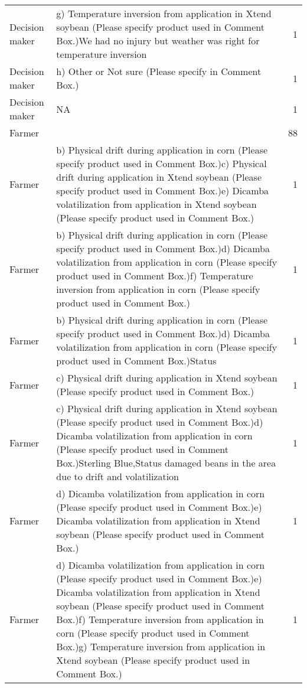 \documentclass[]{article}
\begin{document}
\begin{table}[H]
\begin{tabular}{llr}
Decision maker & g) Temperature inversion from application in Xtend soybean (Please specify product used in Comment Box.)We had no injury but weather was right for temperature inversion & 1\\
Decision maker & h) Other or Not sure (Please specify in Comment Box.) & 1\\
Decision maker & NA & 1\\
Farmer &  & 88\\
\addlinespace
Farmer & b) Physical drift during application in corn (Please specify product used in Comment Box.)c) Physical drift during application in Xtend soybean (Please specify product used in Comment Box.)e) Dicamba volatilization from application in Xtend soybean (Please specify product used in Comment Box.) & 1\\
Farmer & b) Physical drift during application in corn (Please specify product used in Comment Box.)d) Dicamba volatilization from application in corn (Please specify product used in Comment Box.)f) Temperature inversion from application in corn (Please specify product used in Comment Box.) & 1\\
Farmer & b) Physical drift during application in corn (Please specify product used in Comment Box.)d) Dicamba volatilization from application in corn (Please specify product used in Comment Box.)Status & 1\\
Farmer & c) Physical drift during application in Xtend soybean (Please specify product used in Comment Box.) & 1\\
Farmer & c) Physical drift during application in Xtend soybean (Please specify product used in Comment Box.)d) Dicamba volatilization from application in corn (Please specify product used in Comment Box.)Sterling Blue,Status damaged beans in the area due to  drift and volatilization & 1\\
\addlinespace
Farmer & d) Dicamba volatilization from application in corn (Please specify product used in Comment Box.)e) Dicamba volatilization from application in Xtend soybean (Please specify product used in Comment Box.) & 1\\
Farmer & d) Dicamba volatilization from application in corn (Please specify product used in Comment Box.)e) Dicamba volatilization from application in Xtend soybean (Please specify product used in Comment Box.)f) Temperature inversion from application in corn (Please specify product used in Comment Box.)g) Temperature inversion from application in Xtend soybean (Please specify product used in Comment Box.) & 1\\

\end{tabular}
\end{table}
\end{document}
